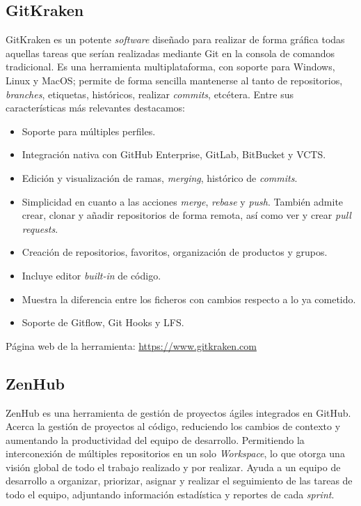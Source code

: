 \subsection{GitKraken}
GitKraken es un potente \textit{software} diseñado para realizar de forma gráfica todas aquellas tareas que serían realizadas mediante Git en la consola de comandos tradicional. Es una herramienta multiplataforma, con soporte para Windows, Linux y MacOS; permite de forma sencilla mantenerse al tanto de repositorios, \textit{branches}, etiquetas, históricos, realizar \textit{commits}, etcétera. Entre sus características más relevantes destacamos:
\begin{itemize}
\tightlist
\item Soporte para múltiples perfiles.
\item Integración nativa con GitHub Enterprise, GitLab, BitBucket y VCTS.
\item Edición y visualización de ramas, \textit{merging}, histórico de \textit{commits}.
\item Simplicidad en cuanto a las acciones \textit{merge}, \textit{rebase} y \textit{push}. También admite crear, clonar y añadir repositorios de forma remota, así como ver y crear \textit{pull requests}.
\item Creación de repositorios, favoritos, organización de productos y grupos.
\item Incluye editor \textit{built-in} de código. 
\item Muestra la diferencia entre los ficheros con cambios respecto a lo ya cometido.
\item Soporte de Gitflow, Git Hooks y LFS.
\end{itemize}

Página web de la herramienta: \url{https://www.gitkraken.com}

\subsection{ZenHub}
ZenHub es una herramienta de gestión de proyectos ágiles integrados en GitHub. Acerca la gestión de proyectos al código, reduciendo los cambios de contexto y aumentando la productividad del equipo de desarrollo. Permitiendo la interconexión de múltiples repositorios en un solo \textit{Workspace}, lo que otorga una visión global de todo el trabajo realizado y por realizar. Ayuda a un equipo de desarrollo a organizar, priorizar, asignar y realizar el seguimiento de las tareas de todo el equipo, adjuntando información estadística y reportes de cada \textit{sprint}.

